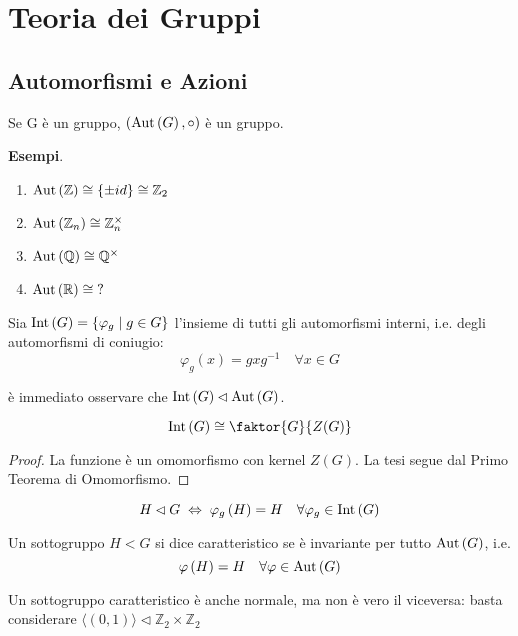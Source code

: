 \setcounter{section}{6} %
\section{Teoria dei Gruppi}
\subsection{Automorfismi e Azioni}
\begin{multicols}{2}
\begin{theorem}
	Se G è un gruppo, $ \left(\mathrm{Aut}\left( G \right), \circ\right) $ è un gruppo.
\end{theorem}

\textbf{Esempi}.
\begin{enumerate}
	\item $ \mathrm{Aut}\left( \mathbb{Z} \right) \cong \{\pm id\} \cong \mathbb{Z}_2 $
	\item $ \mathrm{Aut}\left( \mathbb{Z}_n \right) \cong \mathbb{Z}_n^\times $
	\item $ \mathrm{Aut}\left( \mathbb{Q} \right) \cong \mathbb{Q}^\times $
	\item $ \mathrm{Aut}\left( \mathbb{R} \right) \cong \; ? $
\end{enumerate} 

\begin{definition}
	Sia $ \mathrm{Int}\left( G \right) = \{ \varphi_g \mid g \in G \} $ l'insieme di tutti gli automorfismi interni, i.e. degli automorfismi di coniugio: \[ \varphi_g(x) = gxg^{-1} \quad\forall x \in G \]
\end{definition}
\begin{remark}
	è immediato osservare che $ \mathrm{Int}\left( G \right) \lhd \mathrm{Aut}\left( G \right) $.
\end{remark}
\begin{prop}
	\[ \Int{G} \cong \faktor{G}{Z(G)} \]
\end{prop}
\begin{proof}
	La funzione  è un omomorfismo con kernel $ Z(G) $. La tesi segue dal Primo Teorema di Omomorfismo.
\end{proof}

\begin{remark}
	\[ H \lhd G \;\Leftrightarrow\; \varphi_g\left(H\right) = H \quad \forall \varphi_g \in \mathrm{Int}\left( G \right) \]
\end{remark}

\begin{definition}
	Un sottogruppo $ H < G $ si dice caratteristico se è invariante per tutto $ \mathrm{Aut}\left( G \right) $, i.e. $$ \varphi\left(H\right) = H \quad \forall \varphi \in \mathrm{Aut}\left( G \right) $$
\end{definition}
\begin{remark}
	Un sottogruppo caratteristico è anche normale, ma non è vero il viceversa: basta considerare $ \langle (0, 1) \rangle \lhd \mathbb{Z}_2 \times \mathbb{Z}_2 $
\end{remark}


\end{multicols}
